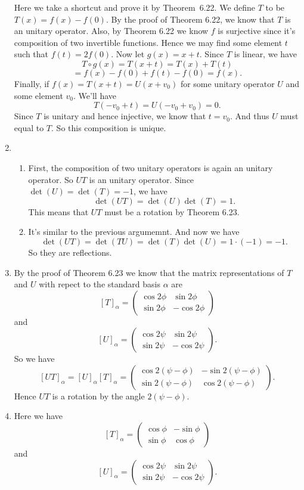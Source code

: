 \begin{enumerate}
Here we take a shortcut and prove it by Theorem~6.22.  We define $T$ to be $T(x)=f(x)-f(0)$. By the proof of Theorem 6.22, we know that $T$ is an unitary operator. Also, by Theorem 6.22 we know $f$ is surjective since it's composition of two invertible functions. Hence we may find some element $t$ such that $f(t)=2f(0)$. Now let $g(x)=x+t$. Since $T$ is linear, we have 
\[T\circ g(x)=T(x+t)=T(x)+T(t)\]
\[=f(x)-f(0)+f(t)-f(0)=f(x).\]
Finally, if $f(x)=T(x+t)=U(x+v_0)$ for some unitary operator $U$ and some element $v_0$. We'll have 
\[T(-v_0+t)=U(-v_0+v_0)=0.\]
Since $T$ is unitary and hence injective, we know that $t=v_0$. And thus $U$ must equal to $T$. So this composition is unique.
\item \begin{enumerate}
\item First, the composition of two unitary operators is again an unitary operator. So $UT$ is an unitary operator. Since $\det(U)=\det(T)=-1$, we have 
\[\det(UT)=\det(U)\det(T)=1.\]
This means that $UT$ must be a rotation by Theorem 6.23.
\item It's similar to the previous argumemnt. And now we have 
\[\det(UT)=\det(TU)=\det(T)\det(U)=1\cdot (-1)=-1.\]
So they are reflections.
\end{enumerate}
\item By the proof of Theorem 6.23 we know that the matrix representations of $T$ and $U$ with repect to the standard basis $\alpha $ are 
\[[T]_{\alpha}=\begin{pmatrix}\cos 2\phi &\sin 2\phi \\\sin 2\phi &-\cos 2\phi \end{pmatrix}\]
and 
\[[U]_{\alpha}=\begin{pmatrix}\cos 2\psi &\sin 2\psi \\\sin 2\psi &-\cos 2\psi \end{pmatrix}.\]
So we have 
\[[UT]_{\alpha}=[U]_{\alpha}[T]_{\alpha}=\begin{pmatrix}\cos 2(\psi-\phi) &-\sin 2(\psi-\phi) \\\sin 2(\psi-\phi) &\cos 2(\psi-\phi) \end{pmatrix}.\]
Hence $UT$ is a rotation by the angle $2(\psi-\phi) $.
\item Here we have 
\[[T]_{\alpha}=\begin{pmatrix}\cos \phi &-\sin \phi \\\sin \phi &\cos \phi \end{pmatrix}\]
and 
\[[U]_{\alpha}=\begin{pmatrix}\cos 2\psi &\sin 2\psi \\\sin 2\psi &-\cos 2\psi \end{pmatrix}.\]

\end{enumerate}
